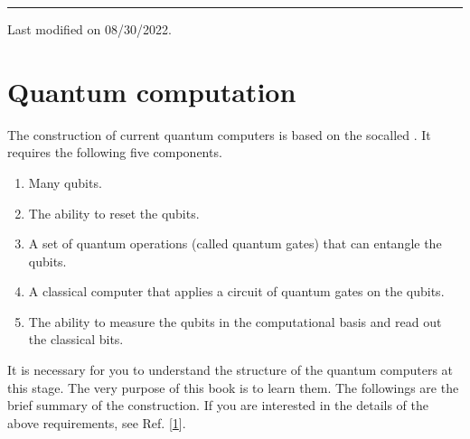 \documentclass[letterpaper,10pt,english]{jupyterBook}
\begin{document}
\bigskip\hrule\bigskip


\sphinxAtStartPar
Last modified on 08/30/2022.

\sphinxstepscope


\section{Quantum computation}
\label{\detokenize{computation/qcomp:quantum-computation}}\label{\detokenize{computation/qcomp:sec-qcomp}}\label{\detokenize{computation/qcomp::doc}}
\sphinxAtStartPar
The construction of current quantum computers is based on the so\sphinxhyphen{}called . It requires the following five components.
\begin{enumerate}
%
\item {}
\sphinxAtStartPar
Many qubits.

\item {}
\sphinxAtStartPar
The ability to reset the qubits.

\item {}
\sphinxAtStartPar
A set of quantum operations (called quantum gates) that can entangle the qubits.

\item {}
\sphinxAtStartPar
A classical computer that applies a circuit of quantum gates on the qubits.

\item {}
\sphinxAtStartPar
The ability to measure the qubits in the computational basis and read out the classical bits.

\end{enumerate}

\sphinxAtStartPar
It is necessary for you to understand the structure of the quantum computers at this stage.  The very purpose of this book is to learn them. The followings are the brief summary of the construction. If you are interested in the details of the above requirements, see Ref. {[}\hyperlink{cite.references:id22}{1}{]}.
\end{document}
